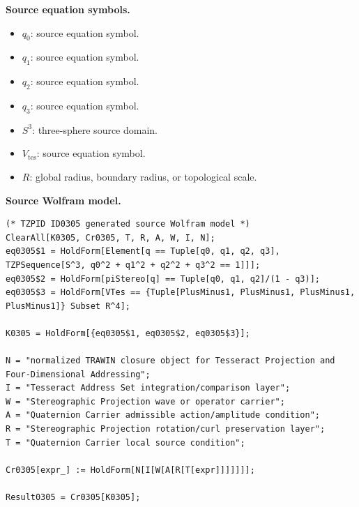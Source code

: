 \begin{minipage}[t]{0.49\linewidth}
\begingroup
\small
\raggedright
\textbf{Source equation symbols.}\par
\begin{itemize}[leftmargin=1.35em,itemsep=1pt,topsep=1pt,parsep=0pt]
    \item $q_0$: source equation symbol.
    \item $q_1$: source equation symbol.
    \item $q_2$: source equation symbol.
    \item $q_3$: source equation symbol.
    \item $S^3$: three-sphere source domain.
    \item $V_{\mathrm{tes}}$: source equation symbol.
    \item $R$: global radius, boundary radius, or topological scale.
\end{itemize}
\endgroup
\end{minipage}\hfill
\begin{minipage}[t]{0.47\linewidth}
\begingroup
\scriptsize
\raggedright
\textbf{Source Wolfram model.}\par
\begin{Verbatim}[fontsize=\tiny,breaklines=true,breakanywhere=true]
(* TZPID ID0305 generated source Wolfram model *)
ClearAll[K0305, Cr0305, T, R, A, W, I, N];
eq0305$1 = HoldForm[Element[q == Tuple[q0, q1, q2, q3], TZPSequence[S^3, q0^2 + q1^2 + q2^2 + q3^2 == 1]]];
eq0305$2 = HoldForm[piStereo[q] == Tuple[q0, q1, q2]/(1 - q3)];
eq0305$3 = HoldForm[VTes == {Tuple[PlusMinus1, PlusMinus1, PlusMinus1, PlusMinus1]} Subset R^4];

K0305 = HoldForm[{eq0305$1, eq0305$2, eq0305$3}];

N = "normalized TRAWIN closure object for Tesseract Projection and Four-Dimensional Addressing";
I = "Tesseract Address Set integration/comparison layer";
W = "Stereographic Projection wave or operator carrier";
A = "Quaternion Carrier admissible action/amplitude condition";
R = "Stereographic Projection rotation/curl preservation layer";
T = "Quaternion Carrier local source condition";

Cr0305[expr_] := HoldForm[N[I[W[A[R[T[expr]]]]]]];

Result0305 = Cr0305[K0305];
\end{Verbatim}
\endgroup
\end{minipage}

